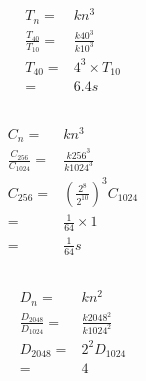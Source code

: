 \documentclass{article}
\begin{document}
    \section{}
        \subsection{}
            \paragraph{
                \begin{equation*}
                    \begin{split}
                        T_n=&kn^3\\
                        \frac{T_{40}}{T_{10}}=&\frac{k40^3}{k10^3}\\
                        T_{40}=&4^3\times T_{10}\\
                        =&6.4 s
                    \end{split}
                \end{equation*}
            }
        \subsection{}
            \paragraph{
                \begin{equation*}
                    \begin{split}
                        C_n=&kn^3\\
                        \frac{C_{256}}{C_{1024}}=&\frac{k256^3}{k1024^3}\\
                        C_{256}=&(\frac{2^8}{2^10})^3C_{1024}\\
                        =&\frac{1}{64}\times 1\\
                        =&\frac{1}{64}s 
                    \end{split}
                \end{equation*}
            }
        \subsection{}
            \begin{equation*}
                \begin{split}
                    D_n=&kn^2\\
                    \frac{D_{2048}}{D_{1024}}=&\frac{k2048^2}{k1024^2}\\
                    D_{2048}=&2^2D_{1024}\\
                        =&4
                \end{split}
            \end{equation*}
\end{document}
